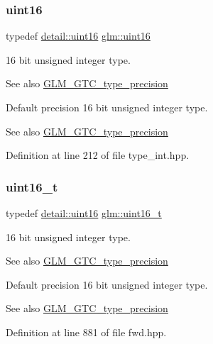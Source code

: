 \subsubsection{\texorpdfstring{uint16}{uint16}}
{\footnotesize\ttfamily typedef \mbox{\hyperlink{namespaceglm_1_1detail_a47b2a7d006d187338e8031a352d1ce56}{detail\+::uint16}} \mbox{\hyperlink{group__gtc__type__precision_gad8c2939e1fdd8e5828b31d95c52255d5}{glm\+::uint16}}}

16 bit unsigned integer type. \begin{DoxySeeAlso}{See also}
\mbox{\hyperlink{group__gtc__type__precision}{G\+L\+M\+\_\+\+G\+T\+C\+\_\+type\+\_\+precision}}
\end{DoxySeeAlso}
Default precision 16 bit unsigned integer type. \begin{DoxySeeAlso}{See also}
\mbox{\hyperlink{group__gtc__type__precision}{G\+L\+M\+\_\+\+G\+T\+C\+\_\+type\+\_\+precision}} 
\end{DoxySeeAlso}


Definition at line 212 of file type\+\_\+int.\+hpp.

\mbox{\label{group__gtc__type__precision_gac4eb4f43cae8129b00086dc234d3b8fc}} 
\subsubsection{\texorpdfstring{uint16\_t}{uint16\_t}}
{\footnotesize\ttfamily typedef \mbox{\hyperlink{namespaceglm_1_1detail_a47b2a7d006d187338e8031a352d1ce56}{detail\+::uint16}} \mbox{\hyperlink{group__gtc__type__precision_gac4eb4f43cae8129b00086dc234d3b8fc}{glm\+::uint16\+\_\+t}}}

16 bit unsigned integer type. \begin{DoxySeeAlso}{See also}
\mbox{\hyperlink{group__gtc__type__precision}{G\+L\+M\+\_\+\+G\+T\+C\+\_\+type\+\_\+precision}}
\end{DoxySeeAlso}
Default precision 16 bit unsigned integer type. \begin{DoxySeeAlso}{See also}
\mbox{\hyperlink{group__gtc__type__precision}{G\+L\+M\+\_\+\+G\+T\+C\+\_\+type\+\_\+precision}} 
\end{DoxySeeAlso}


Definition at line 881 of file fwd.\+hpp.

\mbox{\label{group__gtc__type__precision_ga202b6a53c105fcb7e531f9b443518451}} 
